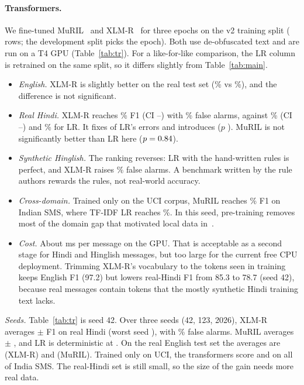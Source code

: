 \documentclass[10pt,twocolumn]{article}
\begin{document}
\paragraph{Transformers.} We fine-tuned MuRIL~\cite{muril} and XLM-R~\cite{xlmr} for three epochs on the v2 training
split (\tTrainRows{} rows; the development split picks the epoch). Both use de-obfuscated text and are run on a T4
GPU (Table~\ref{tab:tr}). For a like-for-like comparison, the LR column is retrained on the same split, so it differs
slightly from Table~\ref{tab:main}.
\begin{itemize}\itemsep0pt
\item \emph{English.} XLM-R is slightly better on the real test set (\tXlRealF\% vs \tLrRealF\%), and the difference
  is not significant.
\item \emph{Real Hindi.} XLM-R reaches \tXlRHF\% F1 (CI \tXlRHciLo--\tXlRHciHi) with \tXlRHFpr\% false alarms,
  against \tLrRHF\% (CI \tLrRHciLo--\tLrRHciHi) and \tLrRHFpr\% for LR. It fixes \tXlRHWins{} of LR's errors and
  introduces \tXlRHLosses{} ($p$ \tXlRHP). MuRIL is not significantly better than LR here ($p=0.84$).
\item \emph{Synthetic Hinglish.} The ranking reverses: LR with the hand-written rules is perfect, and XLM-R raises
  \tXlHinBFpr\% false alarms. A benchmark written by the rule authors rewards the rules, not real-world accuracy.
\item \emph{Cross-domain.} Trained only on the UCI corpus, MuRIL reaches \tMuCrossFull\% F1 on Indian SMS,
  where TF-IDF LR reaches \tLrCrossFull\%. In this seed, pre-training removes most of the domain gap that motivated local data
  in~\cite{scamguard1}.
\item \emph{Cost.} About \tXlMs{} ms per message on the GPU. That is acceptable as a second stage for Hindi and
  Hinglish messages, but too large for the current free CPU deployment. Trimming XLM-R's vocabulary to the tokens
  seen in training keeps English F1 (97.2) but lowers real-Hindi F1 from 85.3 to 78.7 (seed 42), because real
  messages contain tokens that the mostly synthetic Hindi training text lacks.
\end{itemize}
\emph{Seeds.} Table~\ref{tab:tr} is seed 42. Over three seeds (42, 123, 2026), XLM-R averages \sXlRHMean{} $\pm$
\sXlRHSd{} F1 on real Hindi (worst seed \sXlRHMin), with \sXlRHFprMean\% false alarms. MuRIL averages
\sMuRHMean{} $\pm$ \sMuRHSd{}, and LR is deterministic at \tLrRHF. On the real English test set the averages are
\sXlRealMean{} (XLM-R) and \sMuRealMean{} (MuRIL). Trained only on UCI, the transformers score \sMuCrossMean{} and
\sXlCrossMean{} on all of India SMS. The real-Hindi set is still small, so the size of the gain needs more real data.
\end{document}
